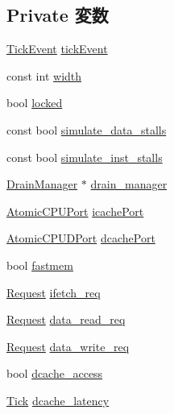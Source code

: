 \subsection*{Private 変数}
\begin{DoxyCompactItemize}
\item 
\hyperlink{structAtomicSimpleCPU_1_1TickEvent}{TickEvent} \hyperlink{classAtomicSimpleCPU_aa36b8e894416f0ec98f701ab08f2ac22}{tickEvent}
\item 
const int \hyperlink{classAtomicSimpleCPU_a837aabdd54757cb86d0f66387511753f}{width}
\item 
bool \hyperlink{classAtomicSimpleCPU_a18a0f1e6c3d21c252b14ea6ae162e2ff}{locked}
\item 
const bool \hyperlink{classAtomicSimpleCPU_aab46afe7eb154b233d2ba1886a4b399f}{simulate\_\-data\_\-stalls}
\item 
const bool \hyperlink{classAtomicSimpleCPU_ac5ff523d495df7133594dec7894aacc7}{simulate\_\-inst\_\-stalls}
\item 
\hyperlink{classDrainManager}{DrainManager} $\ast$ \hyperlink{classAtomicSimpleCPU_af9ba920f669cbe0f18c71846715d690a}{drain\_\-manager}
\item 
\hyperlink{classAtomicSimpleCPU_1_1AtomicCPUPort}{AtomicCPUPort} \hyperlink{classAtomicSimpleCPU_a35e511691227100effd63e8a7fc12989}{icachePort}
\item 
\hyperlink{classAtomicSimpleCPU_1_1AtomicCPUDPort}{AtomicCPUDPort} \hyperlink{classAtomicSimpleCPU_ab6b7665b418b12dc80b485e66d23ed19}{dcachePort}
\item 
bool \hyperlink{classAtomicSimpleCPU_a66f9c88f6fa05c882787a7e98a7101f5}{fastmem}
\item 
\hyperlink{classRequest}{Request} \hyperlink{classAtomicSimpleCPU_a64ba0dde58d6c2c1c5e24a0b3e3b506f}{ifetch\_\-req}
\item 
\hyperlink{classRequest}{Request} \hyperlink{classAtomicSimpleCPU_a836513db061d14f39d79751c40fa9951}{data\_\-read\_\-req}
\item 
\hyperlink{classRequest}{Request} \hyperlink{classAtomicSimpleCPU_af2cc98a9d486d932d85c4513a4670ca8}{data\_\-write\_\-req}
\item 
bool \hyperlink{classAtomicSimpleCPU_a40a30a05f8e2b8b4c62c0ee0a019686a}{dcache\_\-access}
\item 
\hyperlink{base_2types_8hh_a5c8ed81b7d238c9083e1037ba6d61643}{Tick} \hyperlink{classAtomicSimpleCPU_a08f04a43a6d731e966308aaeece77208}{dcache\_\-latency}
\end{DoxyCompactItemize}
